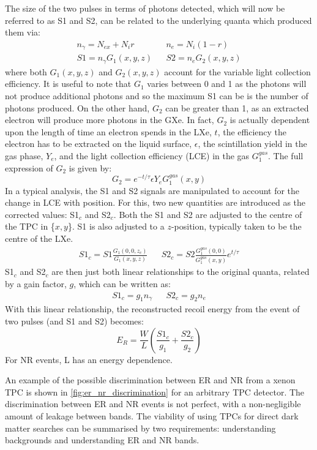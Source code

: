 \par
The size of the two pulses in terms of photons detected, which will now be referred to as S1 and S2, can be related to the underlying quanta which produced them via:
\begin{align}
    n_\gamma = N_{ex} + N_i r && n_e = N_i (1-r) \\
    S1 = n_\gamma G_1(x,y,z) && S2 = n_e G_2(x,y,z)
\end{align}
where both $G_1(x,y,z)$ and $G_2(x,y,z)$ account for the variable light collection efficiency.
It is useful to note that $G_1$ varies between 0 and 1 as the photons will not produce additional photons and so the maximum S1 can be is the number of photons produced.
On the other hand, $G_2$ can be greater than 1, as an extracted electron will produce more photons in the GXe.
In fact, $G_2$ is actually dependent upon the length of time an electron spends in the LXe, $t$, the efficiency the electron has to be extracted on the liquid surface, $\epsilon$, the scintillation yield in the gas phase, $Y_e$, and the light collection efficiency (LCE) in the gas $G_1^{gas}$.
The full expression of $G_2$ is given by:
\begin{equation}
    G_2 = e^{-t/\tau} \epsilon Y_e G_1^{gas}(x,y)
\end{equation}
In a typical analysis, the S1 and S2 signals are manipulated to account for the change in LCE with position.
For this, two new quantities are introduced as the corrected values: S1$_c$ and S2$_c$.
Both the S1 and S2 are adjusted to the centre of the TPC in \{$x,y$\}.
S1 is also adjusted to a $z$-position, typically taken to be the centre of the LXe.
\begin{align}
    S1_c = S1 \frac{G_1(0,0,z_c)}{G_1(x,y,z)} && S2_c = S2 \frac{G_1^{gas}(0,0)}{G_1^{gas}(x,y)} e^{t/\tau}
    \label{eq:s1c_and_s2c_full}
\end{align}
S1$_c$ and S2$_c$ are then just both linear relationships to the original quanta, related by a gain factor, $g$, which can be written as:
\begin{align}
    S1_c = g_1 n_\gamma && S2_c = g_2 n_e
\end{align}
With this linear relationship, the reconstructed recoil energy from the event of two pulses (and S1 and S2) becomes:
\begin{equation}
    E_R = \frac{W}{L}(\frac{S1_c}{g_1} + \frac{S2_c}{g_2})
\end{equation}
For NR events, L has an energy dependence.
\par
An example of the possible discrimination between ER and NR from a xenon TPC is shown in \autoref{fig:er_nr_discrimination} for an arbitrary TPC detector.
The discrimination between ER and NR events is not perfect, with a non-negligible amount of leakage between bands.
The viability of using TPCs for direct dark matter searches can be summarised by two requirements: understanding backgrounds and understanding ER and NR bands.

